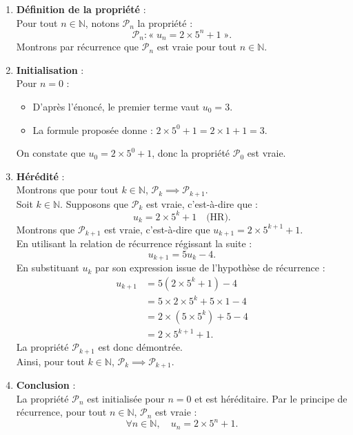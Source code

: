 \documentclass[11pt,a4paper]{article}
\newcommand{\N}{\mathbb{N}}
\begin{document}
\begin{correctionbox}
\begin{enumerate}[label=\textbf{\arabic*.}]
    \item \textbf{Définition de la propriété} :\\
    Pour tout $n \in \N$, notons $\mathcal{P}_n$ la propriété :
    \[
    \mathcal{P}_n : « \; u_n = 2 \times 5^n + 1 \; ».
    \]
    Montrons par récurrence que $\mathcal{P}_n$ est vraie pour tout $n \in \N$.

    \item \textbf{Initialisation} :\\
    Pour $n = 0$ :
    \begin{itemize}
        \item D'après l'énoncé, le premier terme vaut $u_0 = 3$.
        \item La formule proposée donne : $2 \times 5^0 + 1 = 2 \times 1 + 1 = 3$.
    \end{itemize}
    On constate que $u_0 = 2 \times 5^0 + 1$, donc la propriété $\mathcal{P}_0$ est vraie.

    \item \textbf{Hérédité} :\\
    Montrons que pour tout $k \in \N$, $\mathcal{P}_k \implies \mathcal{P}_{k+1}$.\\
    Soit $k \in \N$. Supposons que $\mathcal{P}_k$ est vraie, c'est-à-dire que :
    \[
    u_k = 2 \times 5^k + 1 \quad \text{(HR)}.
    \]
    Montrons que $\mathcal{P}_{k+1}$ est vraie, c'est-à-dire que $u_{k+1} = 2 \times 5^{k+1} + 1$.\\
    En utilisant la relation de récurrence régissant la suite :
    \[
    u_{k+1} = 5u_k - 4.
    \]
    En substituant $u_k$ par son expression issue de l'hypothèse de récurrence :
    \begin{align*}
    u_{k+1} &= 5(2 \times 5^k + 1) - 4 \\
            &= 5 \times 2 \times 5^k + 5 \times 1 - 4 \\
            &= 2 \times (5 \times 5^k) + 5 - 4 \\
            &= 2 \times 5^{k+1} + 1.
    \end{align*}
    La propriété $\mathcal{P}_{k+1}$ est donc démontrée.\\
    Ainsi, pour tout $k \in \N$, $\mathcal{P}_k \implies \mathcal{P}_{k+1}$.

    \item \textbf{Conclusion} :\\
    La propriété $\mathcal{P}_n$ est initialisée pour $n=0$ et est héréditaire. Par le principe de récurrence, pour tout $n \in \N$, $\mathcal{P}_n$ est vraie :
    \[
    \forall n \in \N, \quad u_n = 2 \times 5^n + 1.
    \]
\end{enumerate}
\end{correctionbox}
\end{document}
